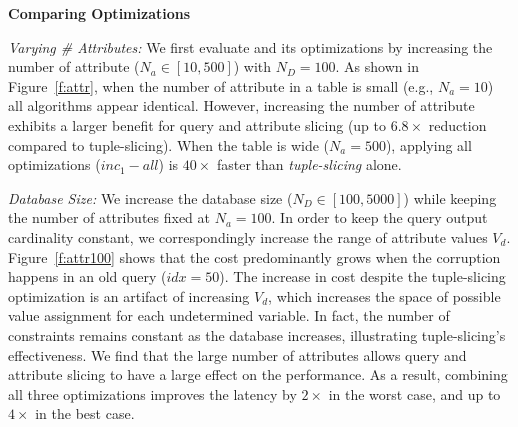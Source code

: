 \noindent\textbf{Comparing Optimizations}

\emph{Varying \# Attributes:}
We first evaluate \sys and its optimizations by increasing the number of attribute ($N_a \in [10, 500]$) with $N_D = 100$.
As shown in Figure~\ref{f:attr}, when the number of attribute in a table is small (e.g., $N_a=10$) all algorithms appear identical. 
However, increasing the number of attribute exhibits a larger benefit for query and attribute slicing (up to $6.8\times$ reduction compared to tuple-slicing).
When the table is wide ($N_a = 500$), applying all optimizations ($inc_1-all$) is $40\times$ faster than \emph{tuple-slicing} alone.  

\emph{Database Size:}
We increase the database size ($N_D \in [100,5000]$) while keeping the number of attributes fixed at $N_a = 100$.
In order to keep the query output cardinality constant, we correspondingly increase the range of attribute values $V_d$.
Figure~\ref{f:attr100} shows that the cost predominantly grows when the corruption happens in an old query ($idx = 50$).
The increase in cost despite the tuple-slicing optimization is an artifact of increasing $V_d$, which increases the space of possible value assignment for each undetermined variable.
In fact, the number of constraints remains constant as the database increases, illustrating tuple-slicing's effectiveness.
We find that the large number of attributes allows query and attribute slicing to have a large effect on the performance.
As a result, combining all three optimizations improves the latency by $2\times$ in the worst case, and up to $4\times$ in the best case.


